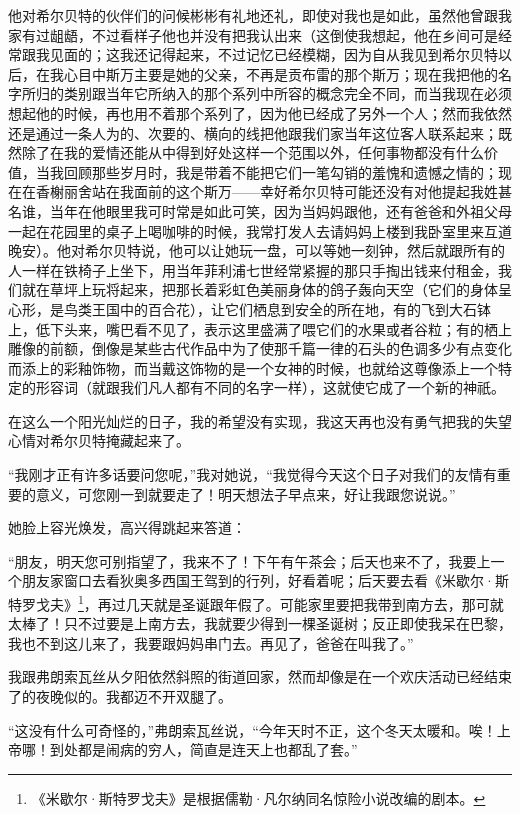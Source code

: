 \par 他对希尔贝特的伙伴们的问候彬彬有礼地还礼，即使对我也是如此，虽然他曾跟我家有过龃龉，不过看样子他也并没有把我认出来（这倒使我想起，他在乡间可是经常跟我见面的；这我还记得起来，不过记忆已经模糊，因为自从我见到希尔贝特以后，在我心目中斯万主要是她的父亲，不再是贡布雷的那个斯万；现在我把他的名字所归的类别跟当年它所纳入的那个系列中所容的概念完全不同，而当我现在必须想起他的时候，再也用不着那个系列了，因为他已经成了另外一个人；然而我依然还是通过一条人为的、次要的、横向的线把他跟我们家当年这位客人联系起来；既然除了在我的爱情还能从中得到好处这样一个范围以外，任何事物都没有什么价值，当我回顾那些岁月时，我是带着不能把它们一笔勾销的羞愧和遗憾之情的；现在在香榭丽舍站在我面前的这个斯万——幸好希尔贝特可能还没有对他提起我姓甚名谁，当年在他眼里我可时常是如此可笑，因为当妈妈跟他，还有爸爸和外祖父母一起在花园里的桌子上喝咖啡的时候，我常打发人去请妈妈上楼到我卧室里来互道晚安）。他对希尔贝特说，他可以让她玩一盘，可以等她一刻钟，然后就跟所有的人一样在铁椅子上坐下，用当年菲利浦七世经常紧握的那只手掏出钱来付租金，我们就在草坪上玩将起来，把那长着彩虹色美丽身体的鸽子轰向天空（它们的身体呈心形，是鸟类王国中的百合花），让它们栖息到安全的所在地，有的飞到大石钵上，低下头来，嘴巴看不见了，表示这里盛满了喂它们的水果或者谷粒；有的栖上雕像的前额，倒像是某些古代作品中为了使那千篇一律的石头的色调多少有点变化而添上的彩釉饰物，而当戴这饰物的是一个女神的时候，也就给这尊像添上一个特定的形容词（就跟我们凡人都有不同的名字一样），这就使它成了一个新的神祇。
\par 在这么一个阳光灿烂的日子，我的希望没有实现，我这天再也没有勇气把我的失望心情对希尔贝特掩藏起来了。
\par “我刚才正有许多话要问您呢，”我对她说，“我觉得今天这个日子对我们的友情有重要的意义，可您刚一到就要走了！明天想法子早点来，好让我跟您说说。”
\par 她脸上容光焕发，高兴得跳起来答道：
\par “朋友，明天您可别指望了，我来不了！下午有午茶会；后天也来不了，我要上一个朋友家窗口去看狄奥多西国王驾到的行列，好看着呢；后天要去看《米歇尔·斯特罗戈夫》\footnote{《米歇尔·斯特罗戈夫》是根据儒勒·凡尔纳同名惊险小说改编的剧本。}，再过几天就是圣诞跟年假了。可能家里要把我带到南方去，那可就太棒了！只不过要是上南方去，我就要少得到一棵圣诞树；反正即使我呆在巴黎，我也不到这儿来了，我要跟妈妈串门去。再见了，爸爸在叫我了。”
\par 我跟弗朗索瓦丝从夕阳依然斜照的街道回家，然而却像是在一个欢庆活动已经结束了的夜晚似的。我都迈不开双腿了。
\par “这没有什么可奇怪的，”弗朗索瓦丝说，“今年天时不正，这个冬天太暖和。唉！上帝哪！到处都是闹病的穷人，简直是连天上也都乱了套。”
